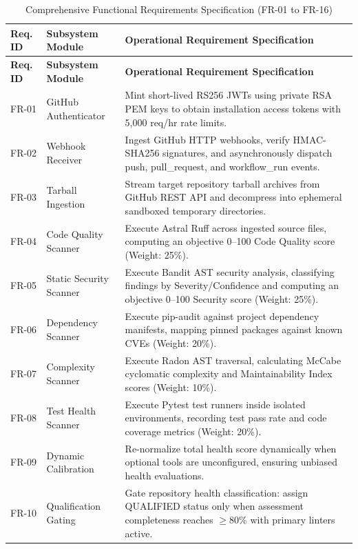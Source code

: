 \documentclass[12pt,a4paper,oneside]{report}
\begin{document}
\begin{longtable}{p{} p{} p{}}
\caption{Comprehensive Functional Requirements Specification (FR-01 to FR-16)} \label{tab:functional-requirements} \\
\toprule
\textbf{Req. ID} & \textbf{Subsystem Module} & \textbf{Operational Requirement Specification} \\
\midrule
\endfirsthead
\toprule
\textbf{Req. ID} & \textbf{Subsystem Module} & \textbf{Operational Requirement Specification} \\
\midrule
\endhead
\bottomrule
\endfoot
\bottomrule
\endlastfoot

FR-01 & GitHub Authenticator & Mint short-lived RS256 JWTs using private RSA PEM keys to obtain installation access tokens with 5,000 req/hr rate limits. \\
\addlinespace
FR-02 & Webhook Receiver & Ingest GitHub HTTP webhooks, verify HMAC-SHA256 signatures, and asynchronously dispatch push, pull\_request, and workflow\_run events. \\
\addlinespace
FR-03 & Tarball Ingestion & Stream target repository tarball archives from GitHub REST API and decompress into ephemeral sandboxed temporary directories. \\
\addlinespace
FR-04 & Code Quality Scanner & Execute Astral Ruff across ingested source files, computing an objective 0--100 Code Quality score (Weight: 25\%). \\
\addlinespace
FR-05 & Static Security Scanner & Execute Bandit AST security analysis, classifying findings by Severity/Confidence and computing an objective 0--100 Security score (Weight: 25\%). \\
\addlinespace
FR-06 & Dependency Scanner & Execute pip-audit against project dependency manifests, mapping pinned packages against known CVEs (Weight: 20\%). \\
\addlinespace
FR-07 & Complexity Scanner & Execute Radon AST traversal, calculating McCabe cyclomatic complexity and Maintainability Index scores (Weight: 10\%). \\
\addlinespace
FR-08 & Test Health Scanner & Execute Pytest test runners inside isolated environments, recording test pass rate and code coverage metrics (Weight: 20\%). \\
\addlinespace
FR-09 & Dynamic Calibration & Re-normalize total health score dynamically when optional tools are unconfigured, ensuring unbiased health evaluations. \\
\addlinespace
FR-10 & Qualification Gating & Gate repository health classification: assign QUALIFIED status only when assessment completeness reaches $\ge 80\%$ with primary linters active. \\

\end{longtable}
\end{document}

